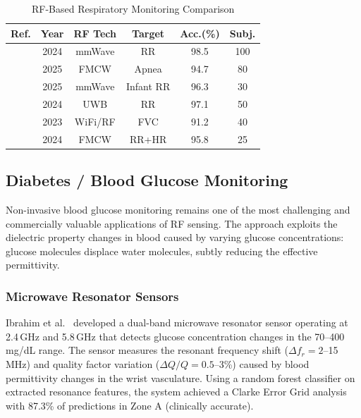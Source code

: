\documentclass[journal,twoside]{IEEEtran}
\begin{document}
\begin{table}[!t]
\centering
\caption{RF-Based Respiratory Monitoring Comparison}
\label{tab:respiratory}
\footnotesize
\setlength{\tabcolsep}{2.5pt}
\begin{tabular}{@{}L{1.2cm} c c c c c@{}}
\toprule
\textbf{Ref.} & \textbf{Year} & \textbf{RF Tech} & \textbf{Target} & \textbf{Acc.(\%)} & \textbf{Subj.} \\
\midrule
\cite{ref_mmwave_dataset2024} & 2024 & mmWave & RR & 98.5 & 100 \\
\cite{ref_radar_complex2025} & 2025 & FMCW & Apnea & 94.7 & 80 \\
\cite{ref_infant2025} & 2025 & mmWave & Infant RR & 96.3 & 30 \\
\cite{ref_uwb_overview2024} & 2024 & UWB & RR & 97.1 & 50 \\
\cite{ref_v2ifi2023} & 2023 & WiFi/RF & FVC & 91.2 & 40 \\
\cite{ref_iot_smartbuild2024} & 2024 & FMCW & RR+HR & 95.8 & 25 \\
\bottomrule
\end{tabular}
\end{table}

\subsection{Diabetes / Blood Glucose Monitoring}
\label{subsec:diabetes}

Non-invasive blood glucose monitoring remains one of the most challenging and commercially valuable applications of RF sensing. The approach exploits the dielectric property changes in blood caused by varying glucose concentrations: glucose molecules displace water molecules, subtly reducing the effective permittivity.

\subsubsection{Microwave Resonator Sensors}
Ibrahim et al.~\cite{ref_glucose_dualband2025} developed a dual-band microwave resonator sensor operating at 2.4\,GHz and 5.8\,GHz that detects glucose concentration changes in the 70--400\,mg/dL range. The sensor measures the resonant frequency shift ($\Delta f_r = 2$--15\,MHz) and quality factor variation ($\Delta Q/Q = 0.5$--3\%) caused by blood permittivity changes in the wrist vasculature. Using a random forest classifier on extracted resonance features, the system achieved a Clarke Error Grid analysis with 87.3\% of predictions in Zone A (clinically accurate).
\end{document}
